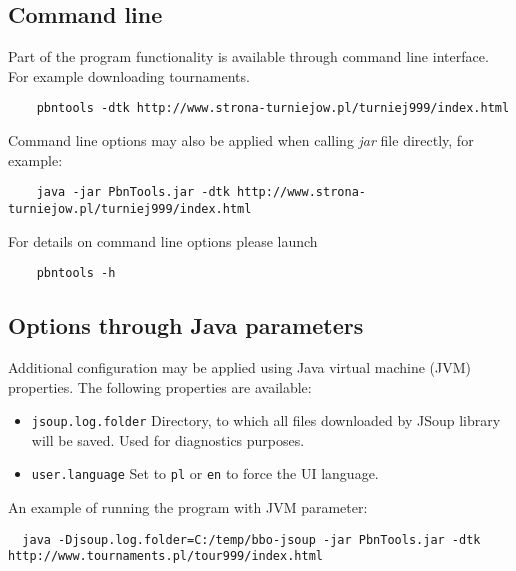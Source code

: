 \documentclass[polish,a4paper,11pt,oneside]{article}
\begin{document}

\subsection{Command line} \label{commLine} %

Part of the program functionality is available through command line
interface. For example downloading tournaments.

\begin{verbatim}
    pbntools -dtk http://www.strona-turniejow.pl/turniej999/index.html
\end{verbatim}

Command line options may also be applied when calling {\em jar} file
directly, for example:

\begin{verbatim}
    java -jar PbnTools.jar -dtk http://www.strona-turniejow.pl/turniej999/index.html
\end{verbatim}

For details on command line options please launch

\begin{verbatim}
    pbntools -h
\end{verbatim}

\subsection{Options through Java parameters}

Additional configuration may be applied using
Java virtual machine (JVM) properties.
The following properties are available:

\begin{itemize}
\item \verb!jsoup.log.folder! Directory, to which all files
  downloaded by JSoup library will be saved.
  Used for diagnostics purposes.
\item \verb!user.language! Set to \verb!pl! or \verb!en! to force the UI language.
\end{itemize}

An example of running the program with JVM parameter:

\begin{verbatim}
  java -Djsoup.log.folder=C:/temp/bbo-jsoup -jar PbnTools.jar -dtk http://www.tournaments.pl/tour999/index.html
\end{verbatim}

\end{document}
